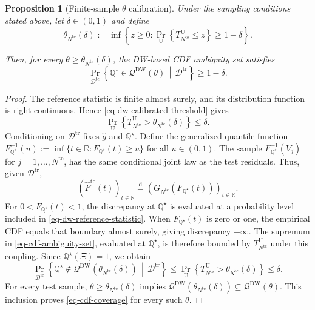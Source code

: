 \documentclass[review,11pt,3p,authoryear,nopreprintline]{elsarticle}
\newtheorem{proposition}{Proposition}
\begin{document}
\begin{proposition}[Finite-sample $\theta$ calibration]
  \label{proposition-01}
  Under the sampling conditions stated above, let $\delta\in(0,1)$ and define
  \begin{equation}
    \theta_{N^{\mathrm{te}}}(\delta):=\inf\left\{z\ge0:\Pr_{\mathrm U}\left\{T_{N^{\mathrm{te}}}^{\mathrm U}\le z\right\}\ge1-\delta\right\}.
    \label{eq-dw-calibrated-threshold}
  \end{equation}

  Then, for every $\theta\ge\theta_{N^{\mathrm{te}}}(\delta)$, the DW-based CDF ambiguity set satisfies
  \begin{equation}
    \Pr_{\mathcal D^{\mathrm{te}}}\left\{\mathbb Q^\star\in\mathscr Q^{\mathrm{DW}}(\theta)\,\middle|\,\mathcal D^{\mathrm{tr}}\right\}\ge1-\delta.
    \label{eq-cdf-coverage}
  \end{equation}
\end{proposition}
\begin{proof}
  The reference statistic is finite almost surely, and its distribution function is right-continuous. Hence \eqref{eq-dw-calibrated-threshold} gives
  \[
    \Pr_{\mathrm U}\left\{T_{N^{\mathrm{te}}}^{\mathrm U}>\theta_{N^{\mathrm{te}}}(\delta)\right\}\le\delta.
  \]
  Conditioning on $\mathcal D^{\mathrm{tr}}$ fixes $\hat g$ and $\mathbb Q^\star$. Define the generalized quantile function $F_{\mathbb Q^\star}^{-1}(u):=\inf\{t\in\mathbb R:F_{\mathbb Q^\star}(t)\ge u\}$ for all $u\in(0,1)$. The sample $F_{\mathbb Q^\star}^{-1}(V_j)$ for $j=1,\ldots,N^{\mathrm{te}}$, has the same conditional joint law as the test residuals. Thus, given $\mathcal D^{\mathrm{tr}}$,
  \[
    \left(\widehat F^{\mathrm{te}}(t)\right)_{t\in\mathbb R}\overset{\mathrm d}{=}\left(G_{N^{\mathrm{te}}}\!\left(F_{\mathbb Q^\star}(t)\right)\right)_{t\in\mathbb R}.
  \]
  For $0<F_{\mathbb Q^\star}(t)<1$, the discrepancy at $\mathbb Q^\star$ is evaluated at a probability level included in \eqref{eq-dw-reference-statistic}. When $F_{\mathbb Q^\star}(t)$ is zero or one, the empirical CDF equals that boundary almost surely, giving discrepancy $-\infty$. The supremum in \eqref{eq-cdf-ambiguity-set}, evaluated at $\mathbb Q^\star$, is therefore bounded by $T_{N^{\mathrm{te}}}^{\mathrm U}$ under this coupling. Since $\mathbb Q^\star(\Xi)=1$, we obtain
  \[
    \Pr_{\mathcal D^{\mathrm{te}}}\left\{\mathbb Q^\star\notin\mathscr Q^{\mathrm{DW}}\!\left(\theta_{N^{\mathrm{te}}}(\delta)\right)\,\middle|\,\mathcal D^{\mathrm{tr}}\right\}
    \le\Pr_{\mathrm U}\left\{T_{N^{\mathrm{te}}}^{\mathrm U}>\theta_{N^{\mathrm{te}}}(\delta)\right\}\le\delta.
  \]
  For every test sample, $\theta\ge\theta_{N^{\mathrm{te}}}(\delta)$ implies $\mathscr Q^{\mathrm{DW}}\!\left(\theta_{N^{\mathrm{te}}}(\delta)\right)\subseteq\mathscr Q^{\mathrm{DW}}(\theta)$. This inclusion proves \eqref{eq-cdf-coverage} for every such $\theta$.
\end{proof}
\end{document}
